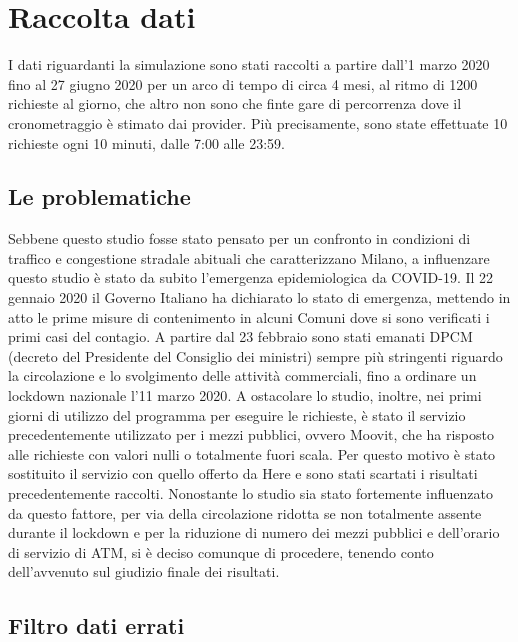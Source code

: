 \section{Raccolta dati}

I dati riguardanti la simulazione sono stati raccolti a partire dall'1 marzo 2020 fino al 27 giugno 2020 per un arco di tempo di circa 4 mesi, al ritmo di 1200 richieste al giorno, che altro non sono che finte gare di percorrenza dove il cronometraggio è stimato dai provider. Più precisamente, sono state effettuate 10 richieste ogni 10 minuti, dalle 7:00 alle 23:59.

\subsection{Le problematiche}

Sebbene questo studio fosse stato pensato per un confronto in condizioni di traffico e congestione stradale abituali che caratterizzano Milano, a influenzare questo studio è stato da subito l'emergenza epidemiologica da COVID-19. Il 22 gennaio 2020 il Governo Italiano ha dichiarato lo stato di emergenza, mettendo in atto le prime misure di contenimento in alcuni Comuni dove si sono verificati i primi casi del contagio. A partire dal 23 febbraio sono stati emanati DPCM (decreto del Presidente del Consiglio dei ministri) sempre più stringenti riguardo la circolazione e lo svolgimento delle attività commerciali, fino a ordinare un lockdown nazionale l'11 marzo 2020\cite{misuredelgovernopercovid}. A ostacolare lo studio, inoltre, nei primi giorni di utilizzo del programma per eseguire le richieste, è stato il servizio precedentemente utilizzato per i mezzi pubblici, ovvero Moovit, che ha risposto alle richieste con valori nulli o totalmente fuori scala. Per questo motivo è stato sostituito il servizio con quello offerto da Here e sono stati scartati i risultati precedentemente raccolti. Nonostante lo studio sia stato fortemente influenzato da questo fattore, per via della circolazione ridotta se non totalmente assente durante il lockdown e per la riduzione di numero dei mezzi pubblici e dell'orario di servizio di ATM, si è deciso comunque di procedere, tenendo conto dell'avvenuto sul giudizio finale dei risultati.

\subsection{Filtro dati errati}

